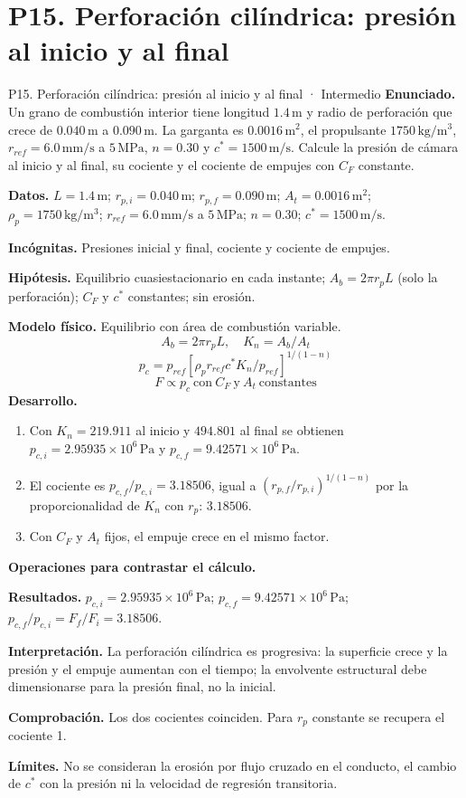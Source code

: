 \section{P15. Perforación cilíndrica: presión al inicio y al final}
\begin{studiumworked}{P15. Perforación cilíndrica: presión al inicio y al final · Intermedio}
\textbf{Enunciado.} Un grano de combustión interior tiene longitud $1.4\,\mathrm m$ y radio de perforación que crece de $0.040\,\mathrm m$ a $0.090\,\mathrm m$. La garganta es $0.0016\,\mathrm{m^2}$, el propulsante $1750\,\mathrm{kg/m^3}$, $r_{ref}=6.0\,\mathrm{mm/s}$ a $5\,\mathrm{MPa}$, $n=0.30$ y $c^*=1500\,\mathrm{m/s}$. Calcule la presión de cámara al inicio y al final, su cociente y el cociente de empujes con $C_F$ constante.

\textbf{Datos.} $L=1.4\,\mathrm m$; $r_{p,i}=0.040\,\mathrm m$; $r_{p,f}=0.090\,\mathrm m$; $A_t=0.0016\,\mathrm{m^2}$; $\rho_p=1750\,\mathrm{kg/m^3}$; $r_{ref}=6.0\,\mathrm{mm/s}$ a $5\,\mathrm{MPa}$; $n=0.30$; $c^*=1500\,\mathrm{m/s}$.

\textbf{Incógnitas.} Presiones inicial y final, cociente y cociente de empujes.

\textbf{Hipótesis.} Equilibrio cuasiestacionario en cada instante; $A_b=2\pi r_pL$ (solo la perforación); $C_F$ y $c^*$ constantes; sin erosión.

\textbf{Modelo físico.} Equilibrio con área de combustión variable.
\[A_b=2\pi r_pL,\quad K_n=A_b/A_t\]
\[p_c=p_{ref}\left[\rho_pr_{ref}c^*K_n/p_{ref}\right]^{1/(1-n)}\]
\[F\propto p_c\ \text{con}\ C_F\ \text{y}\ A_t\ \text{constantes}\]
\textbf{Desarrollo.}
\begin{enumerate}
\item Con $K_n=219.911$ al inicio y $494.801$ al final se obtienen $p_{c,i}=2.95935\times10^{6}\,\mathrm{Pa}$ y $p_{c,f}=9.42571\times10^{6}\,\mathrm{Pa}$.
\item El cociente es $p_{c,f}/p_{c,i}=3.18506$, igual a $(r_{p,f}/r_{p,i})^{1/(1-n)}$ por la proporcionalidad de $K_n$ con $r_p$: $3.18506$.
\item Con $C_F$ y $A_t$ fijos, el empuje crece en el mismo factor.
\end{enumerate}
\textbf{Operaciones para contrastar el cálculo.}

\textbf{Resultados.} $p_{c,i}=2.95935\times10^{6}\,\mathrm{Pa}$; $p_{c,f}=9.42571\times10^{6}\,\mathrm{Pa}$; $p_{c,f}/p_{c,i}=F_f/F_i=3.18506$.

\textbf{Interpretación.} La perforación cilíndrica es progresiva: la superficie crece y la presión y el empuje aumentan con el tiempo; la envolvente estructural debe dimensionarse para la presión final, no la inicial.

\textbf{Comprobación.} Los dos cocientes coinciden. Para $r_p$ constante se recupera el cociente 1.

\textbf{Límites.} No se consideran la erosión por flujo cruzado en el conducto, el cambio de $c^*$ con la presión ni la velocidad de regresión transitoria.
\end{studiumworked}
